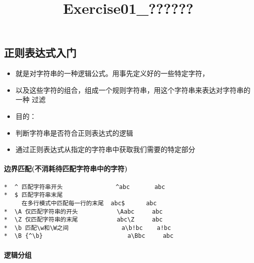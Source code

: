 \documentclass[11pt]{article}
\title{Exercise01\_??????}
\begin{document}
    
    
    \maketitle
    
    

    
    \subsection{正则表达式入门}\label{ux6b63ux5219ux8868ux8fbeux5f0fux5165ux95e8}

\begin{itemize}
\item
  就是对字符串的一种逻辑公式。用事先定义好的一些特定字符，
\item
  以及这些字符的组合，组成一个规则字符串，用这个字符串来表达对字符串的一种
  过滤
\item
  目的：
\item
  判断字符串是否符合正则表达式的逻辑
\item
  通过正则表达式从指定的字符串中获取我们需要的特定部分
\end{itemize}

\paragraph{边界匹配(不消耗待匹配字符串中的字符)}\label{ux8fb9ux754cux5339ux914dux4e0dux6d88ux8017ux5f85ux5339ux914dux5b57ux7b26ux4e32ux4e2dux7684ux5b57ux7b26}

\begin{verbatim}
*  ^ 匹配字符串开头               ^abc       abc
*  $ 匹配字符串末尾
     在多行模式中匹配每一行的末尾  abc$      abc
*  \A 仅匹配字符串的开头           \Aabc     abc
*  \Z 仅匹配字符串的末尾           abc\Z     abc
*  \b 匹配\w和\W之间               a\b!bc    a!bc
*  \B {^\b}                        a\Bbc     abc
\end{verbatim}

\paragraph{逻辑分组}\label{ux903bux8f91ux5206ux7ec4}
\end{document}
